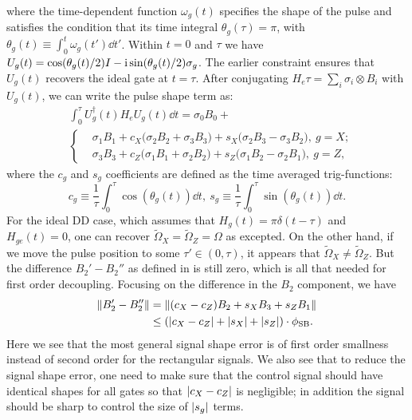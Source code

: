 \documentclass[pra,reprint,superscriptaddress]{revtex4-2}
\newcommand{\wt}[1]{\widetilde{#1}}
\begin{document}
where the time-dependent function $\omega_g(t)$ specifies the shape of the pulse and satisfies the condition that its time integral $\theta_g(\tau)=\pi$, with $\theta_g(t)\equiv \int_0^t \omega_g(t') \dd t'$.
Within $t=0$ and $\tau$ we have 
$U_g(t) = \cos({\theta_g(t)}/{2} ) I -\mathrm{i} \sin({\theta_g(t)}/{2} )\sigma_g$.
The earlier constraint ensures that $U_g(t)$ recovers the ideal gate at $t=\tau$. 
After conjugating $H_e\tau = \sum_i \sigma_i \otimes B_i$ with $U_g(t)$,
we can write the pulse shape term as:
\begin{equation}\label{eq:pshape-term}
\begin{aligned}
&\int_0^\tau\!\! U_g^\dagger(t) H_e U_g(t) \dd t =\sigma_0 B_0  + \\
 & \left\{
 \begin{aligned}
   & \sigma_1 B_1 + 
   c_X \bigl( \sigma_2  B_2 + 
   \sigma_3 B_3 \bigr)+ 
   s_X
    \bigl(\sigma_2 B_3 - \sigma_3 B_2\bigr),\ g=X;\\
    &\sigma_3 B_3  + c_Z \bigl( \sigma_1  B_1 + 
   \sigma_2 B_2 \bigr)+ 
   s_Z
    \bigl(\sigma_1 B_2 - \sigma_2 B_1\bigr),\ g=Z,
 \end{aligned}
 \right.
\end{aligned}
\end{equation}
where the $c_g$ and $s_g$ coefficients are defined as the time averaged trig-functions:
\begin{equation}
 c_g \equiv \frac{1}{\tau}\int_0^\tau \cos(\theta_g(t)) \dd t, \ s_g \equiv \frac{1}{\tau}\int_0^\tau \sin(\theta_g(t)) \dd t.  
\end{equation}
For the ideal DD case, which assumes that $H_g(t)=\pi\delta(t-\tau)$ and  $H_{ge}(t)=0$, one can recover $\wt \Omega_X =\wt \Omega_Z = \Omega$ as excepted. 
On the other hand, if we move the pulse position to some $\tau'\in(0,\tau)$, it appears that $\wt \Omega_X \neq \wt \Omega_Z$. But the difference 
$B_2'-B_2''$ as defined in  is still zero, which is all that needed for first order decoupling. Focusing on the difference in the  $B_2$  component, 
we have 
\begin{equation}
\begin{aligned}
  \Vert {B_2'-B_2''} \Vert & = \Vert {(c_X-c_Z)B_2+s_X B_3 +s_Z B_1} \Vert\\
  &\le ({\left\vert c_X-c_Z\right\vert} + {\left\vert s_X\right\vert} + {\left\vert s_Z\right\vert})\cdot \phi_{\mathrm{SB}}.
\end{aligned}
\end{equation}
Here we see that the most general signal shape error is of first order smallness instead of second order for the rectangular signals. 
We also see that to reduce the signal shape error, one need to make sure that 
the control signal should have identical shapes for all gates so that ${\left\vert c_X-c_Z\right\vert}$
is negligible; in addition the signal should be sharp to control the size of ${\left\vert s_g\right\vert}$ terms. 
\end{document}

